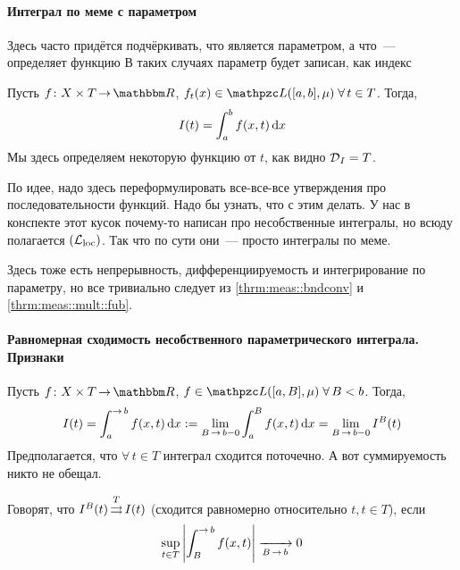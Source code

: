 \documentclass[draft, timbord]{longnotes}
\begin{document}
\paragraph*{Интеграл по меме с параметром}

Здесь часто придётся подчёркивать, что является параметром, а что~--- определяет функцию
В таких случаях параметр будет записан, как индекс

\begin{defn}\label{defn:meas::paruniconv::prop}
  Пусть $f\colon X \times T \to \R$, $f_t(x)\in \summb([a,b],\mu) \; \forall\, t \in T$. 
  Тогда, 
  \[
    I(t) = \int_a^{b} f(x,t) \, \mathrm{d} x 
  \]
  Мы здесь определяем некоторую функцию от $t$, как видно $\operatorname{\mathcal D}_I = T$.
\end{defn}

По идее, надо здесь переформулировать все-все-все утверждения про последовательности функций.
Надо бы узнать, что с этим делать.
\flame 
У нас в конспекте этот кусок почему-то написан про несобственные интегралы, но всюду полагается
$(\mathcal L_{\rm loc})$. Так что по сути они~--- просто интегралы по меме.

Здесь тоже есть непрерывность, дифференциируемость и интегрирование по параметру, но
все тривиально следует из \ref{thrm:meas::bndconv} и \ref{thrm:meas::mult::fub}.

\paragraph{Равномерная сходимость несобственного параметрического интеграла. Признаки}
\label{par:meas::paruniconv}


\begin{defn}\label{defn:meas::paruniconv::improp}
  Пусть $f\colon X \times T \to \R$,
  $f\in \summb([a,B],\mu) \;\forall\, B <b$. Тогда,
  \[
    I(t) = \int_a^{\to b} f(x,t) \, \del x := \lim_{B\to b-0} \int_a^B f(x,t) \, \del x 
    = \lim_{B\to b-0} I^B(t)
  \]
  Предполагается, что $\forall\, t \in T$ интеграл сходится поточечно. А вот суммируемость
  никто не обещал.
\end{defn}


\begin{defn}\label{defn:meas::paruniconv::uniconv}
  Говорят, что $I^B(t) \mathop{\rightrightarrows}\limits^T I(t)$ (сходится равномерно относительно $t, t\in T$), если 
  \[
    \sup_{t\in T} \left| \int_B^{\to b} f(x,t)\right| \xto{B\to b} 0
  \]
\end{defn}
\end{document}
